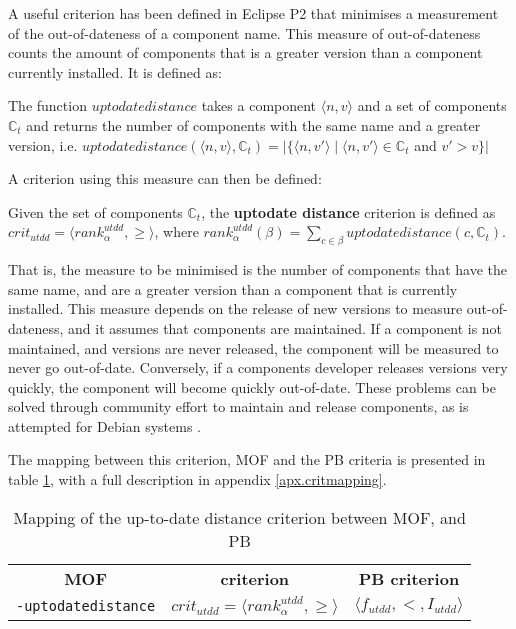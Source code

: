 A useful criterion has been defined in Eclipse P2 that minimises a measurement of the out-of-dateness of a component name.
This measure of out-of-dateness counts the amount of components that is a greater version than a component currently installed.
It is defined as:
\begin{defs}
The function $uptodatedistance$ takes a component $\langle n, v \rangle$ and a set of components $\mathbb{C}_t$ and returns the number of components with the same name and a greater version,
i.e. $uptodatedistance(\langle n, v \rangle,\mathbb{C}_t) = |\{\langle n, v' \rangle \mid \langle n, v' \rangle \in \mathbb{C}_t $ and $ v' > v \}|$
\end{defs}

A criterion using this measure can then be defined:
\begin{defs}
	Given the set of components $\mathbb{C}_t$, the \textbf{uptodate distance} criterion is defined as $crit_{utdd} = \langle rank^{utdd}_{\alpha}, \geq \rangle$,
	where $rank^{utdd}_{\alpha}(\beta) = \sum_{c \in \beta} uptodatedistance(c,\mathbb{C}_t)$.
\end{defs}
That is, the measure to be minimised is the number of components that have the same name, and are a greater version than a component that is currently installed.
This measure depends on the release of new versions to measure out-of-dateness, and it assumes that components are maintained.
If a component is not maintained, and versions are never released, the component will be measured to never go out-of-date.
Conversely, if a components developer releases versions very quickly, the component will become quickly out-of-date.
These problems can be solved through community effort to maintain and release components, as is attempted for Debian systems \citep{Barth2005}.

The mapping between this criterion, MOF and the PB criteria is presented in table \ref{impl.ucritmapping}, with a full description in appendix \ref{apx.critmapping}.
\begin{table}[h!]
\centering
\begin{tabular}{c | c | c}
\textbf{MOF} 		& \textbf{\modelname criterion} & \textbf{PB criterion} \\
\texttt{-uptodatedistance} 	& $crit_{utdd} = \langle rank^{utdd}_{\alpha}, \geq \rangle$ & $\langle f_{utdd}, <, I_{utdd} \rangle$ \\
\end{tabular}
\caption{Mapping of the up-to-date distance criterion between MOF, \modelname and PB}
\label{impl.ucritmapping}
\end{table}

